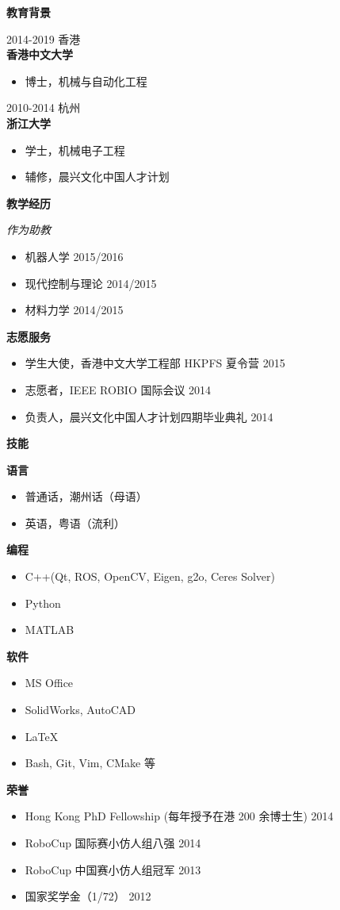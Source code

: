 \documentclass[11pt]{article}
\newcommand{\subsec}[1]{
  \vskip 4pt
  {\bf\large\color{teal}  #1}
  \vskip 1pt
}
\newcommand{\yearspaceevent}[3]{
  {\color{gray} \small #1 \hfill #2}\\
  {\bf #3}
}
\newcommand{\yearat}[1]{
  {\hfill \color{gray} #1}
}
\begin{document}
\begin{minipage}[t]{0.34\textwidth}
  \subsec{教育背景}
  \yearspaceevent{2014-2019}{香港}{香港中文大学}
  \begin{itemize}
    \item 博士，机械与自动化工程
  \end{itemize}

  \yearspaceevent{2010-2014}{杭州}{浙江大学}
  \begin{itemize}
    \item 学士，机械电子工程
    \item 辅修，晨兴文化中国人才计划
  \end{itemize}

  \subsec{教学经历}
  \emph{作为助教}
  \begin{itemize}
    \item 机器人学 \yearat{2015/2016}
    \item 现代控制与理论 \yearat{2014/2015}
    \item 材料力学 \yearat{2014/2015}
  \end{itemize}

  \subsec{志愿服务}
  \begin{itemize}
    \item 学生大使，香港中文大学工程部 HKPFS 夏令营  \yearat{2015}
    \item 志愿者，IEEE ROBIO 国际会议 \yearat{2014}
    \item 负责人，晨兴文化中国人才计划四期毕业典礼 \yearat{2014}
  \end{itemize}

  \subsec{技能}
  {\bf 语言}
  \begin{itemize}
    \item 普通话，潮州话（母语）
    \item 英语，粤语（流利）
  \end{itemize}
  {\bf 编程}
  \begin{itemize}
    \item C++(Qt, ROS, OpenCV, Eigen, g2o, Ceres Solver)
    \item Python
    \item MATLAB
  \end{itemize}
  {\bf 软件}
  \begin{itemize}
    \item MS Office
    \item SolidWorks, AutoCAD
    \item \LaTeX
    \item Bash, Git, Vim, CMake 等
  \end{itemize}

  \subsec{荣誉}
  \begin{itemize}
    \item Hong Kong PhD Fellowship (每年授予在港 200 余博士生) \yearat{2014}
    \item RoboCup 国际赛小仿人组八强 \yearat{2014}
    \item RoboCup 中国赛小仿人组冠军 \yearat{2013}
    \item 国家奖学金（1/72） \yearat{2012}
  \end{itemize}
\end{minipage}
\end{document}

